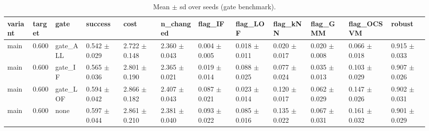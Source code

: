 \begin{table}[t]
\centering
\caption{Mean $\pm$ sd over seeds (gate benchmark).}
\label{tab:gate_benchmark_summary}
\small
\begin{tabular}{llllllllllll}
\toprule
variant & target & gate & success & cost & n\_changed & flag\_IF & flag\_LOF & flag\_kNN & flag\_GMM & flag\_OCSVM & robust \\
\midrule
main & 0.600 & gate\_ALL & 0.542 $\pm$ 0.029 & 2.722 $\pm$ 0.148 & 2.360 $\pm$ 0.043 & 0.004 $\pm$ 0.005 & 0.018 $\pm$ 0.011 & 0.020 $\pm$ 0.017 & 0.020 $\pm$ 0.008 & 0.066 $\pm$ 0.018 & 0.915 $\pm$ 0.033 \\
main & 0.600 & gate\_IF & 0.565 $\pm$ 0.036 & 2.801 $\pm$ 0.190 & 2.365 $\pm$ 0.021 & 0.019 $\pm$ 0.014 & 0.088 $\pm$ 0.025 & 0.077 $\pm$ 0.024 & 0.035 $\pm$ 0.013 & 0.103 $\pm$ 0.029 & 0.907 $\pm$ 0.026 \\
main & 0.600 & gate\_LOF & 0.594 $\pm$ 0.042 & 2.866 $\pm$ 0.182 & 2.407 $\pm$ 0.043 & 0.087 $\pm$ 0.021 & 0.023 $\pm$ 0.014 & 0.120 $\pm$ 0.017 & 0.062 $\pm$ 0.029 & 0.147 $\pm$ 0.026 & 0.902 $\pm$ 0.031 \\
main & 0.600 & none & 0.597 $\pm$ 0.044 & 2.861 $\pm$ 0.210 & 2.381 $\pm$ 0.040 & 0.093 $\pm$ 0.022 & 0.085 $\pm$ 0.016 & 0.135 $\pm$ 0.022 & 0.067 $\pm$ 0.031 & 0.161 $\pm$ 0.032 & 0.901 $\pm$ 0.029 \\
\bottomrule
\end{tabular}
\end{table}
